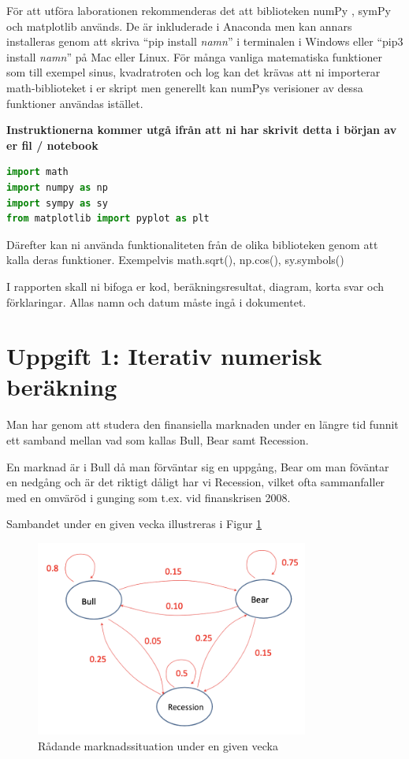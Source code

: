 \documentclass[a4paper]{article}
\begin{document}
För att utföra laborationen rekommenderas det att biblioteken numPy \cite{numpy-main},
symPy \cite{sympy-main} och matplotlib \cite{matplotlib-main} används. De är inkluderade i Anaconda men kan annars installeras genom att
skriva ``pip install \textit{namn}'' i terminalen i Windows eller ``pip3 install \textit{namn}'' på Mac eller Linux.
För många vanliga matematiska funktioner som till
exempel sinus, kvadratroten och log kan det krävas att ni importerar math-biblioteket i er skript men generellt kan numPys
verisioner av dessa funktioner användas istället.

\textbf{Instruktionerna kommer utgå ifrån att ni har skrivit detta i början av er fil / notebook}
\begin{lstlisting}[language=Python]
import math 
import numpy as np
import sympy as sy
from matplotlib import pyplot as plt
\end{lstlisting}

Därefter kan ni använda funktionaliteten från de olika biblioteken genom att
kalla deras funktioner. Exempelvis math.sqrt(), np.cos(), sy.symbols()

I rapporten skall ni bifoga er kod, beräkningsresultat, diagram, korta svar och förklaringar.
Allas namn och datum måste ingå i dokumentet.

\newpage
\section{Uppgift 1: Iterativ numerisk beräkning}
Man har genom att studera den finansiella marknaden under en längre tid funnit ett samband mellan vad som kallas Bull, Bear samt Recession.

En marknad är i Bull då man förväntar sig en uppgång, Bear om man föväntar en nedgång och är det riktigt dåligt har vi Recession, vilket ofta sammanfaller
med en omväröd i gunging som t.ex. vid finanskrisen 2008.

Sambandet under en given vecka illustreras i Figur \ref{fig:bbr}

\begin{figure}[H]
  \centering
  \includegraphics[width=0.8\textwidth]{bbr.png}
  \caption{Rådande marknadssituation under en given vecka}
  \label{fig:bbr}
\end{figure}
\end{document}
